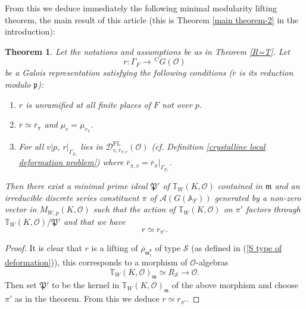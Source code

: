 \documentclass[12pt,oneside,reqno]{amsart}
\theoremstyle{plain}
\newtheorem{theorem}{Theorem}[section]
\begin{document}
	From this we deduce immediately the following minimal
	modularity lifting theorem,
	the main result of this article (this is Theorem \ref{main theorem-2} in the introduction):
	\begin{theorem}\label{modularity}
		Let the notations and assumptions be as in Theorem \ref{R=T}. Let
		\[
		r\colon
		\Gamma_F
		\rightarrow
		\,^C
		G(\mathcal{O})
		\]
		be a Galois representation satisfying the following conditions ($\overline{r}$ is
		its reduction modulo $\mathfrak{p}$):
		\begin{enumerate}
			\item
			$r$ is unramified at all finite places of $F$ not over $p$.
			
			
			
			\item 
			$\overline{r}\simeq\overline{r}_{\pi}$ and $\mu_r=\mu_{r_\pi}$.
			
			\item 
			For all $v|p$, $r|_{\Gamma_{F_v}}$ lies in $\mathcal{D}^\mathrm{FL}_{v,\overline{r}_{\pi,v}}(\mathcal{O})$ (\emph{cf.} Definition \ref{crystalline local deformation problem})
			where $\overline{r}_{\pi,v}
			=\overline{r}_\pi|_{\Gamma_{F_v}}$.
			
			
		\end{enumerate}
		
		
		
		Then there exist a minimal prime ideal $\mathfrak{P}'$ of $\mathbb{T}_W(K,\mathcal{O})$ contained in $\mathfrak{m}$ and an irreducible discrete series constituent $\pi$ of $\mathcal{A}(G(\mathbb{A}_F))$ generated by a non-zero vector in  $M_{W,p}(K,\mathcal{O})$ such that the action of $\mathbb{T}_W(K,\mathcal{O})$ on $\pi'$ factors through $\mathbb{T}_W(K,\mathcal{O})/\mathfrak{P}'$ and that we have
		\[
		r\simeq
		r_{\pi'}.
		\]
	\end{theorem}
	\begin{proof}
		It is clear that $r$ is a lifting of $\overline{\rho}_{\mathfrak{m}_1^\emptyset}$ of type $\mathcal{S}$ (as defined in (\ref{S type of deformation})), this corresponds to a morphism of $\mathcal{O}$-algebras
		\[
		\mathbb{T}_W(K,\mathcal{O})_{\mathfrak{m}}
		\simeq
		R_\mathcal{S}
		\to
		\mathcal{O}.
		\]
		Then set $\mathfrak{P}'$ to be the kernel in $\mathbb{T}_W(K,\mathcal{O})_\mathfrak{m}$ of the above morphism and choose $\pi'$ as in the theorem. From this we deduce $r\simeq r_{\pi'}$.
		
		
		
		
		
	\end{proof}
	
\end{document}
